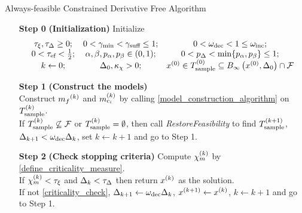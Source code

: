 {
\begin{fullwidth}[leftmargin=0in, rightmargin=0in, width=\linewidth-0.25in]
\begin{flushleft}


\begin{algorithm}[H]
    \caption{Always-feasible Constrained Derivative Free Algorithm}	
    \label{constrained_dfo}
    \begin{itemize}
        \item[\textbf{Step 0}] \textbf{(Initialization)} Initialize
\begin{align*}
\begin{array}{ccc}
\tau_{\xi}, \tau_{\Delta} \ge 0; & 
0 < \gamma_{\textrm{min}} < \gamma_{\textrm{suff}} \le 1; & 
0 < \omega_{\text{dec}} < 1 \le \omega_{\text{inc}}; \\
0 < {\tau_{\textrm{ef}}} < \frac 1 2;  & 
\alpha, \beta, p_{\alpha}, p_{\beta} \in (0, 1); & 
0 < p_{\Delta} < \min\{p_{\alpha}, p_{\beta}\} \le 1;  \\
k \gets 0; &
\Delta_0, \kappa_{\chi} > 0; &
{x^{(0)}} \in T^{(0)}_{\textrm{sample}} \subseteq B_{\infty}\left({x^{(0)}}, \Delta_{0}\right) \cap {\mathcal F}
\end{array}
\end{align*}
        \item[\textbf{Step 1}] \textbf{(Construct the models)} \\
        Construct ${{m}_f}^{(k)}$ and ${{m}^{(k)}_{c_i}}$ by calling \cref{model_construction_algorithm} on ${T_{\text{sample}}^{(k)}}$. \\
        If ${T_{\text{sample}}^{(k)}} \not \subseteq {\mathcal F}$ or ${T_{\text{sample}}^{(k)}} = \emptyset$, then call \emph{RestoreFeasibility}  to find ${T_{\text{sample}}^{(k+1)}}$, $\Delta_{k+1}<\omega_{\text{dec}} \Delta_k$, set $k \gets k + 1$ and go to Step 1.
        
        \item[\textbf{Step 2}] \textbf{(Check stopping criteria)}
        	Compute ${\chi_m^{(k)}}$ by \cref{define_criticality_measure}. \\
			If $ {\chi_m^{(k)}} < \tau_{\xi} $ and $\Delta_k <\tau_{\Delta}$ then return $x^{(k)}$ as the solution. \\
			If not \cref{criticality_check},
                $\Delta_{k+1} \gets \omega_{\text{dec}}\Delta_k$, 
                $x^{(k+1)} \gets x^{(k)}$,
                $k \gets k+1$ and go to Step 1.
		

\end{itemize}
\end{algorithm}
\end{flushleft}
\end{fullwidth}}
